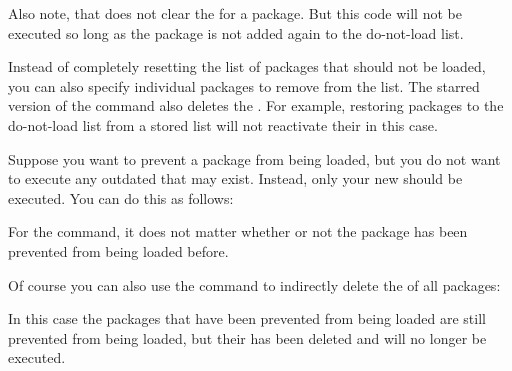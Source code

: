 Also note, that 
does not clear the  for a package. But this code 
will not be executed so long as the package is not added again to the
do-not-load list.%
\EndIndexGroup


\begin{Declaration}
\end{Declaration}
Instead of completely resetting the list
of packages that should not be loaded, you can also specify individual
packages to remove from the list. The starred version of the command also
deletes the . For example, restoring packages to the
do-not-load list from a stored list will not reactivate their  in this case.%
%
\begin{Example}
  Suppose you want to prevent a  package from being loaded, but
  you do not want to execute any outdated  that may
  exist. Instead, only your new  should be executed. You
  can do this as follows:
\begin{lstcode}
\end{lstcode}
  For the  command, it does not matter
  whether or not the package has been prevented from being loaded before.

  Of course you can also use the command to indirectly delete the
   of all packages:
\begin{lstcode}
  \StorePreventPackageFromLoading\TheWholePreventList
  \UnPreventPackageFromLoading*{\TheWholePreventList}
  \PreventPackageFromLoading{\TheWholePreventList}
\end{lstcode}
  In this case the packages that have been prevented from being loaded are
  still prevented from being loaded, but their  has been
  deleted and will no longer be executed.%
\end{Example}%
\EndIndexGroup
%
\EndIndexGroup

\endinput

